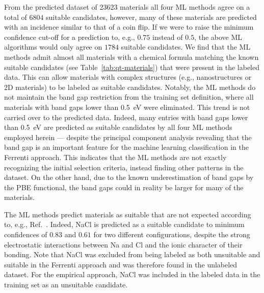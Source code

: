 \documentclass[superscriptaddress,
preprint,
 amsmath,amssymb,
 aps,
]{revtex4-2}
\begin{document}
From the predicted dataset of \num{23623} materials  
all four ML methods agree on a total of $6804$ suitable candidates, however, many of these materials are predicted with an incidence similar to that of a coin flip. If we were to raise the minimum confidence cut-off for a prediction to, e.g., $0.75$ instead of $0.5$, the above ML algorithms would only agree on $1784$ suitable candidates. 
We find that the ML methods admit almost all materials with a chemical formula matching the known suitable candidates (see Table~\ref{tab:qt-materials}) that were present in the labeled data. This can allow materials with complex structures (e.g., nanostructures or 2D materials) to be labeled as suitable candidates. Notably, the ML methods do not maintain the band gap restriction from the training set definition, where all materials with band gaps lower than \SI{0.5}{\electronvolt} were eliminated. 
This trend is not carried over to the predicted data. Indeed, many entries with band gaps lower than \SI{0.5}{\electronvolt} are predicted as suitable candidates by all four ML methods employed herein 
--- despite the principal component analysis revealing that the band gap is an important feature for the machine learning classification in the Ferrenti approach. This indicates that the ML methods are not exactly recognizing the initial selection criteria, instead finding other patterns in the dataset. 
On the other hand, due to the known  underestimation of band gaps by the PBE  functional, the band gaps could in reality be larger for many of the materials. 

The ML methods predict materials as suitable that are not expected according to, e.g., Ref.~\cite{Weber2010}. Indeed, NaCl is predicted as a suitable candidate to minimum confidences of $0.83$ and $0.61$ for two different configurations, despite the strong electrostatic interactions between Na and Cl and the ionic character of their bonding. Note that NaCl was excluded from being labeled as both unsuitable and suitable in the Ferrenti approach and was therefore found in the unlabeled dataset. For the empirical approach, NaCl was included in the labeled data in the training set as an unsuitable candidate.
\end{document}
